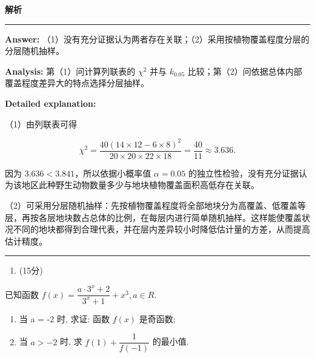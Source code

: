 \documentclass[UTF8,12pt,a4paper]{ctexart}
\renewcommand{\labelenumi}{\arabic{enumi}.}
\newenvironment{examSolutionBox}{%
  \par\medskip\begingroup
  \setlength{\leftskip}{1.0em}\setlength{\rightskip}{0.9em}%
  \noindent\textcolor{SolutionTeal}{\bfseries\large 解析}\par
  \smallskip\noindent\textcolor{SolutionRule}{\rule{\dimexpr\linewidth-\leftskip-\rightskip\relax}{0.8pt}}\par
  \smallskip\color{SolutionInk}%
}{%
  \par\smallskip\noindent\textcolor{SolutionRule}{\rule{\dimexpr\linewidth-\leftskip-\rightskip\relax}{0.8pt}}\par
  \endgroup\medskip
}
\providecommand{\tightlist}{%
  \setlength{\itemsep}{0pt}\setlength{\parskip}{0pt}}
\begin{document}
\begin{examSolutionBox}

\textbf{Answer:} （1）没有充分证据认为两者存在关联；（2）采用按植物覆盖程度分层的分层随机抽样。

\textbf{Analysis:} 第（1）问计算列联表的 \(\chi^2\) 并与 \(k_{0.05}\) 比较；第（2）问依据总体内部覆盖程度差异大的特点选择分层抽样。

\textbf{Detailed explanation:}

（1）由列联表可得

\[
   \chi^2=\dfrac{40(14\times12-6\times8)^2}{20\times20\times22\times18}
   =\dfrac{40}{11}\approx3.636.
   \]

因为 \(3.636<3.841\)，所以依据小概率值 \(\alpha=0.05\) 的独立性检验，没有充分证据认为该地区此种野生动物数量多少与地块植物覆盖面积高低存在关联。

（2）可采用分层随机抽样：先按植物覆盖程度将全部地块分为高覆盖、低覆盖等层，再按各层地块数占总体的比例，在每层内进行简单随机抽样。这样能使覆盖状况不同的地块都得到合理代表，并在层内差异较小时降低估计量的方差，从而提高估计精度。

\end{examSolutionBox}

\begin{enumerate}
\def\labelenumi{\arabic{enumi}.}
\setcounter{enumi}{15}
\tightlist
\item
  (15分)
\end{enumerate}

已知函数 \(f(x)=\dfrac{a\cdot3^{x}+2}{3^{x}+1}+x^{3},a\in R.\)

\begin{enumerate}
\def\labelenumi{(\arabic{enumi})}
\item
  当 a = -2 时, 求证: 函数 \(f(x)\) 是奇函数;
\item
  当 \(a > -2\) 时, 求 \(f(1) + \dfrac{1}{f(-1)}\) 的最小值.
\end{enumerate}
\end{document}

